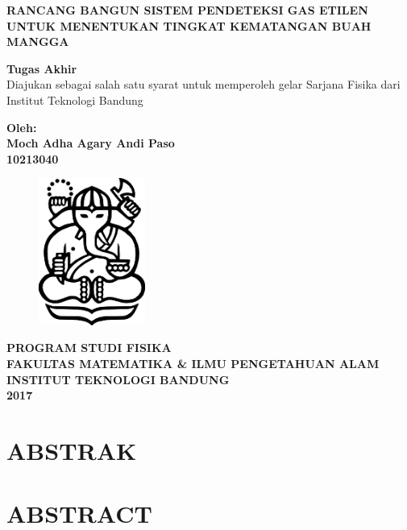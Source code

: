 \documentclass[12pt,a4paper]{report}
\begin{document}
\begin{titlepage}
	\centering
	{\textbf{RANCANG BANGUN SISTEM PENDETEKSI GAS ETILEN UNTUK MENENTUKAN TINGKAT KEMATANGAN BUAH MANGGA}}
	
	\vspace{2cm}
	\textbf{Tugas Akhir} \\
	Diajukan sebagai salah satu syarat untuk memperoleh gelar Sarjana Fisika dari Institut Teknologi Bandung
	
	\vspace{1cm}
	\textbf{Oleh: \\
	Moch Adha Agary Andi Paso \\
	10213040}
	
	\vspace{1cm}
	\begin{figure}[!htbp]
		\centering
		\includegraphics[width=3.5cm]{resources/itb_logo.png}
		\label{cover}
	\end{figure}
		
	\vspace{2cm}
	{\textbf{PROGRAM STUDI FISIKA \\
	FAKULTAS MATEMATIKA \& ILMU PENGETAHUAN ALAM \\
	INSTITUT TEKNOLOGI BANDUNG \\
	2017 \\}}
\end{titlepage}

\setcounter{page}{1}
\chapter*{\centering ABSTRAK}


\chapter*{\centering ABSTRACT}

\end{document}
